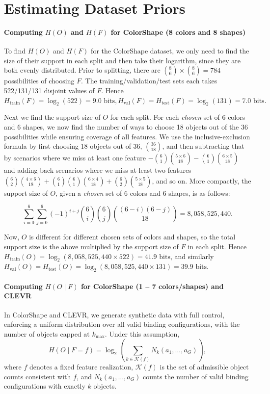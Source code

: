 \documentclass{article}
\theoremstyle{plain}
\theoremstyle{definition}
\theoremstyle{remark}
\begin{document}
\section{Estimating Dataset Priors}\label{app:hbf}

\paragraph{Computing $H(O)$ and $H(F)$ for ColorShape (8 colors and 8 shapes)}

To find $H(O)$ and $H(F)$ for the ColorShape dataset, we only need to find the size of their support in each split and then take their logarithm, since they are both evenly distributed. Prior to splitting, there are $\binom{8}{6}\times \binom{8}{6}=784$ possibilities of choosing $F$. The training/validation/test sets each takes 522/131/131 disjoint values of $F$. Hence $H_{\text{train}}(F)=\log_2(522)=9.0 \text{ bits}, H_{\text{val}}(F)=H_{\text{test}}(F)=\log_2(131)=7.0  \text{ bits}.$

Next we find the support size of $O$ for each split. For each \textit{chosen} set of 6 colors and 6 shapes, we now find the number of ways to choose 18 objects out of the 36 possibilities while ensuring coverage of all features. We use the inclusive-exclusion formula by first choosing 18 objects out of 36, $\binom{36}{18}$, and then subtracting that by scenarios where we miss at least one feature $-\binom{6}{1}\binom{5\times 6}{18}-\binom{6}{1}\binom{6\times 5}{18}$ and adding back scenarios where we miss at least two features $\binom{6}{2}\binom{4\times 6}{18}+\binom{6}{1}\binom{6}{1}\binom{6\times 4}{18}+\binom{6}{2}\binom{5\times 5}{18}$, and so on. More compactly, the support size of $O$, given a \textit{chosen} set of 6 colors and 6 shapes, is as follows:

\[\sum_{i=0}^{6} \sum_{j=0}^{6} (-1)^{i+j} \binom{6}{i} \binom{6}{j} \binom{(6-i)(6-j)}{18}=8,058,525,440.
\]

Now, $O$ is different for different chosen sets of colors and shapes, so the total support size is the above multiplied by the support size of $F$ in each split. Hence $H_{\text{train}}(O)=\log_2(8,058,525,440\times 522)=41.9 \text{ bits}$, and similarly $H_{\text{val}}(O)=H_{\text{test}}(O)=\log_2(8,058,525,440\times 131)=39.9 \text{ bits}$.

\paragraph{Computing $H(O\mid F)$ for ColorShape (1 -- 7 colors/shapes) and CLEVR}
In ColorShape and CLEVR, we generate synthetic data with full control, enforcing a uniform distribution over all valid binding configurations, with the number of objects capped at $k_{\max}$. Under this assumption,
\[
H(O \mid F=f)
=
\log_2 \!\left( \sum_{k \in \mathcal{K}(f)} N_k(a_1,\dots,a_G) \right),
\]
where $f$ denotes a fixed feature realization, $\mathcal{K}(f)$ is the set of admissible object counts consistent with $f$, and $N_k(a_1,\dots,a_G)$ counts the number of valid binding configurations with exactly $k$ objects.
\end{document}

